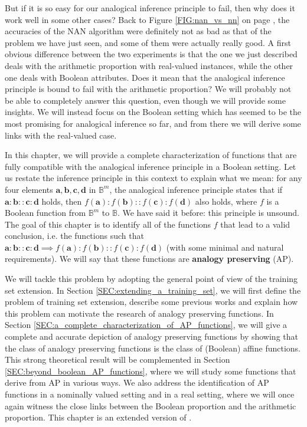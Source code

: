 But if it is so easy for our analogical inference principle to fail, then why
does it work well in some other cases? Back to Figure \ref{FIG:nan_vs_nn} on
page \pageref{FIG:nan_vs_nn}, the accuracies of the NAN algorithm were
definitely not as bad as that of the problem we have just seen, and some of
them were actually really good. A first obvious difference between the two
experiments is that the one we just described deals with the arithmetic
proportion with real-valued instances, while the other one deals with Boolean
attributes. Does it mean that the analogical inference principle is bound to
fail with the arithmetic proportion? We will probably not be able to completely
answer this question, even though we will provide some insights.  We will
instead focus on the Boolean setting which has seemed to be the most promising
for analogical inference so far, and from there we will derive some links with
the real-valued case.

In this chapter, we will provide a complete characterization of functions that
are fully compatible with the analogical inference principle in a Boolean
setting. Let us restate the inference principle in this context to explain what
we mean: for any four elements $\mathbf{a}, \mathbf{b}, \mathbf{c}, \mathbf{d}$
in $\mathbb{B}^m$, the analogical inference principle states that if
$\mathbf{a}: \mathbf{b}:: \mathbf{c}: \mathbf{d}$ holds, then $f(\mathbf{a}):
f(\mathbf{b}):: f(\mathbf{c}): f(\mathbf{d})$ also holds, where $f$ is a Boolean function
from $\mathbb{B}^m$ to $\mathbb{B}$. We have said it before:  this principle is
unsound. The goal of this chapter is to identify all of the functions $f$ that
lead to a valid conclusion, i.e. the functions such that $\mathbf{a}:
\mathbf{b}:: \mathbf{c}: \mathbf{d} \implies f(\mathbf{a}):f(\mathbf{b})::
f(\mathbf{c}): f(\mathbf{d})$ (with some minimal and natural requirements). We
will say that these functions are \textbf{analogy preserving} (AP).

We will tackle this problem by adopting the general point of view of  the
training set extension. In Section \ref{SEC:extending_a_training_set}, we will
first define the problem of training set extension, describe some previous
works and explain how this problem can motivate the research of analogy
preserving functions. In Section
\ref{SEC:a_complete_characterization_of_AP_functions}, we will give a complete
and accurate depiction of analogy preserving functions by showing that the
class of analogy preserving functions is the class of (Boolean) affine
functions. This strong theoretical result will be complemented in Section
\ref{SEC:beyond_boolean_AP_functions}, where we will study some functions that
derive from AP in various ways. We also address the identification of AP
functions in a nominally valued setting and in a real setting, where we will
once again witness the close links between the Boolean proportion and the
arithmetic proportion. This chapter is an extended version of
\cite{CouHugPraRicIJCAI17}.

